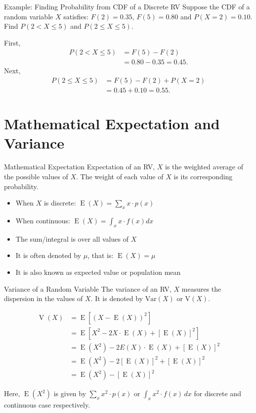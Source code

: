 \documentclass[12pt, aspectratio=169]{beamer}
\DeclareMathOperator{\E}{E}
\DeclareMathOperator{\V}{V}
\begin{document}
	\begin{frame}{Example: Finding Probability from CDF of a Discrete RV}
		Suppose the CDF of a random variable \(X\) satisfies: \(F(2) = 0.35\), \(F(5) = 0.80\) and \(P(X=2) = 0.10\). Find \(P(2 < X \leqslant 5)\) and \(P(2 \leqslant X \leqslant 5)\).

		\vspace{0.5em}

		First,
		\begin{align*}
			P(2 < X \leqslant 5) &= F(5) - F(2) \\
			&= 0.80 - 0.35 = 0.45.
		\end{align*}
		Next,
		\begin{align*}
			P(2 \leqslant X \leqslant 5) &= F(5) - F(2) + P(X=2) \\
			&= 0.45 + 0.10 = 0.55.
		\end{align*}
			 
	\end{frame}


	\section{Mathematical Expectation and Variance}


	\begin{frame}{Mathematical Expectation}
		Expectation of an RV, $X$ is the weighted average of the possible values of $X$. The weight of each value of $X$ is its corresponding probability.

		\begin{itemize}
			\item When $X$ is discrete: \(\E(X) = \displaystyle \sum_{x} x\cdot p(x)\)
			\item When continuous: \(\E(X) = \displaystyle \int_{x} x\cdot f(x) dx\)
			\item The sum/integral is over all values of \(X\)
			\item It is often denoted by \(\mu\), that is: \(\E(X) = \mu\)
			\item It is also known as expected value or population mean
		\end{itemize}
	\end{frame}


	\begin{frame}{Variance of a Random Variable}
		The variance of an RV, \(X\) measures the dispersion in the values of \(X\). It is denoted by \(\mathrm{Var}(X)\) or \(\mathrm{V}(X)\).

		\begin{align*}
			\V(X) &= \E[(X-\E(X))^2] \\
			&= \E[X^2 - 2X \cdot \E(X) + [\E(X)]^2] \\
			&= \E(X^2) - 2E(X)\cdot \E(X) + [\E(X)]^2 \\
			&= \E(X^2) - 2[\E(X)]^2 + [\E(X)]^2 \\
			&= \E(X^2) - [\E(X)]^2
		\end{align*}

		Here, \(\E(X^2)\) is given by \(\displaystyle \sum_x x^2 \cdot p(x)\) or \(\displaystyle \int_x x^2 \cdot f(x) \, dx\) for discrete and continuous case respectively.
	\end{frame}
\end{document}
